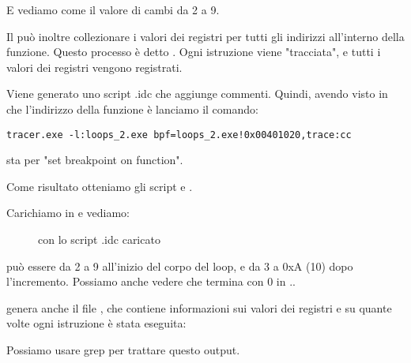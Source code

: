 E vediamo come il valore di \ESI cambi da 2 a 9.


Il \tracer può inoltre collezionare i valori dei registri per tutti gli indirizzi all'interno della funzione.
Questo processo è detto . Ogni istruzione viene "tracciata", e tutti i valori dei registri vengono registrati.

Viene generato uno script \IDA .idc che aggiunge commenti.
Quindi, avendo visto in \IDA che l'indirizzo della funzione \main è  lanciamo il comando:

\begin{lstlisting}
tracer.exe -l:loops_2.exe bpf=loops_2.exe!0x00401020,trace:cc
\end{lstlisting}

 sta per "set breakpoint on function".

Come risultato otteniamo gli script  e .

\clearpage
Carichiamo  in \IDA e vediamo:

\begin{figure}[H]
\centering
{}
\caption{\IDA con lo script .idc caricato}
\label{fig:loops_IDA_tracer}
\end{figure}

\ESI può essere da 2 a 9 all'inizio del corpo del loop, e da 3 a 0xA (10) dopo l'incremento.
Possiamo anche vedere che \main termina con 0 in \EAX..

\tracer genera anche il file , 
che contiene informazioni sui valori dei registri e su quante volte ogni istruzione è stata eseguita:


\myindex{\GrepUsage}
Possiamo usare grep per trattare questo output.

